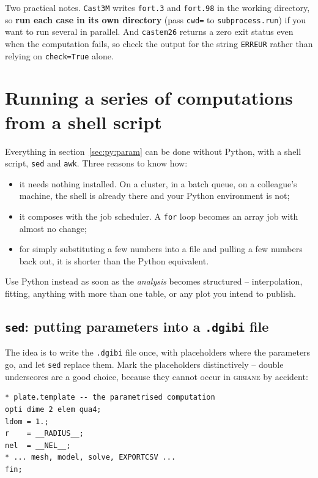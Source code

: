 \noindent Two practical notes. \texttt{Cast3M} writes \texttt{fort.3} and
\texttt{fort.98} in the working directory, so \textbf{run each case in its own
directory} (pass \texttt{cwd=} to \texttt{subprocess.run}) if you want to run
several in parallel. And \texttt{castem26} returns a zero exit status even
when the computation fails, so check the output for the string
\texttt{ERREUR} rather than relying on \texttt{check=True} alone.

\section{Running a series of computations from a shell script}
\label{sec:py:shell}

%
Everything in section~\ref{sec:py:param} can be done without Python, with a
shell script, \texttt{sed} and \texttt{awk}. Three reasons to know how:

\begin{itemize}
\item it needs nothing installed. On a cluster, in a batch queue, on a
  colleague's machine, the shell is already there and your Python environment
  is not;
\item it composes with the job scheduler. A \texttt{for} loop becomes an
  array job with almost no change;
\item for simply substituting a few numbers into a file and pulling a few
  numbers back out, it is shorter than the Python equivalent.
\end{itemize}

\noindent Use Python instead as soon as the \emph{analysis} becomes
structured -- interpolation, fitting, anything with more than one table, or
any plot you intend to publish.

\subsection{\texttt{sed}: putting parameters into a \texttt{.dgibi} file}

%
The idea is to write the \texttt{.dgibi} file once, with placeholders where
the parameters go, and let \texttt{sed} replace them. Mark the placeholders
distinctively -- double underscores are a good choice, because they cannot
occur in \textsc{gibiane} by accident:

\begin{codebox}
\begin{verbatim}
* plate.template -- the parametrised computation
opti dime 2 elem qua4;
ldom = 1.;
r    = __RADIUS__;
nel  = __NEL__;
* ... mesh, model, solve, EXPORTCSV ...
fin;
\end{verbatim}
\end{codebox}

